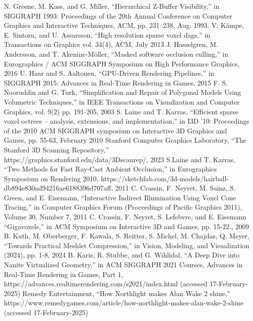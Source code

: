 \documentclass[conference]{IEEEtran}
\begin{document}
\begin{thebibliography}{00}
 N. Greene, M. Kass, and G. Miller, ``Hierarchical Z-Buffer Visibility,'' in SIGGRAPH 1993: Proceedings of the 20th Annual Conference on Computer Graphics and Interactive Techniques, ACM, pp. 231–238, Aug. 1993.
 V. Kämpe, E. Sintorn, and U. Assarsson, ``High resolution sparse voxel dags,'' in Transactions on Graphics vol. 34(4), ACM, July 2013
 J. Hasselgren, M. Andersson, and T. Akenine-Möller, ``Masked software occlusion culling,'' in Eurographics / ACM SIGGRAPH Symposium on High Performance Graphics, 2016
 U. Haar and S. Aaltonen, ``GPU-Driven Rendering Pipelines,'' in SIGGRAPH 2015: Advances in Real-Time Rendering in Games, 2015
 F. S. Nooruddin and G. Turk, ``Simplification and Repair of Polygonal Models Using Volumetric Techniques,'' in IEEE Transactions on Visualization and Computer Graphics, vol. 9(2) pp. 191-205, 2003
 S. Laine and T. Karras, ``Efficient sparse voxel octrees – analysis, extensions, and implementation,'' in I3D '10: Proceedings of the 2010 ACM SIGGRAPH symposium on Interactive 3D Graphics and Games, pp. 55-63, February 2010
 Stanford Computer Graphics Laboratory, ``The Stanford 3D Scanning Repository,'' https://graphics.stanford.edu/data/3Dscanrep/, 2023
 S.Laine and T. Karras, ``Two Methods for Fast Ray-Cast Ambient Occlusion,'' in Eurographics Symposium on Rendering 2010,  https://sketchfab.com/3d-models/hairball-db894e830ad94216ae6188396d707aff, 2011
 C. Crassin, F. Neyret, M. Sainz, S. Green, and E. Eisemann, ``Interactive Indirect Illumination Using Voxel Cone Tracing,'' in Computer Graphics Forum (Proceedings of Pacific Graphics 2011), Volume 30, Number 7, 2011
 C. Crassin, F. Neyret, S. Lefebvre, and E. Eisemann ``Gigavoxels,'' in ACM Symposium on Interactive 3D and Games, pp. 15-22., 2009
 B. Kuth, M. Oberberger, F. Kawala, S. Reitter, S. Michel, M. Chajdas, Q. Meyer, ``Towards Practical Meshlet Compression,'' in Vision, Modeling, and Visualization (2024), pp. 1-8, 2024
 B. Karis, R. Stubbe, and G. Wihlidal, ``A Deep Dive into Nanite Virtualized Geometry,'' in ACM SIGGRAPH 2021 Courses, Advances in Real-Time Rendering in Games, Part 1, https://advances.realtimerendering.com/s2021/index.html (accessed 17-February-2025)
 Remedy Entertainment, ``How Northlight makes Alan Wake 2 shine,'' https://www.remedygames.com/article/how-northlight-makes-alan-wake-2-shine (accessed 17-February-2025)
\end{thebibliography}
\vspace{12pt}
\end{document}
